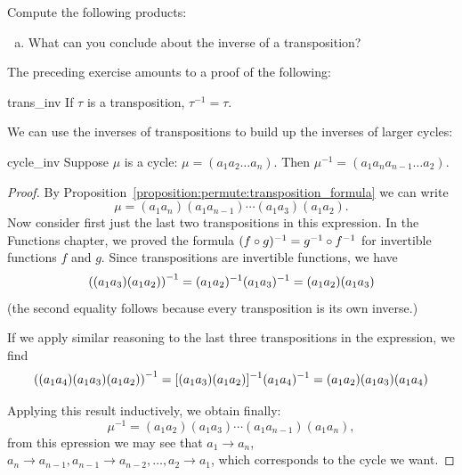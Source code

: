\begin{exercise}{}
Compute the following products:
\begin{enumerate}[(a)]
\item
What can you conclude about the inverse of a transposition?
\end{enumerate}
\end{exercise}

\noindent
The preceding exercise amounts to a proof of the following:

\begin{prop}{trans_inv}
If $\tau$ is a transposition, $\tau^{-1} = \tau$.
\end{prop}

We can use the inverses of transpositions to build up the inverses of larger cycles:

\begin{prop}{cycle_inv}
Suppose $\mu$ is a cycle: $\mu = (a_1 a_2 \ldots  a_n)$. Then $\mu^{-1} = (a_1 a_n a_{n-1}  \ldots a_2 )$.
\end{prop}

\begin{proof}
By Proposition~\ref{proposition:permute:transposition_formula} we can write 
\[ \mu = (a_1 a_n ) (a_1 a_{n-1} ) \cdots ( a_1 a_3) (a_1 a_2).
\]
Now consider first just the last two transpositions in this expression.
In the Functions chapter, we proved the formula  $(f \circ g)^{-1} = g^{-1} \circ f^{-1}$ for invertible functions $f$ and $g$.
Since transpositions are invertible functions, we have
\[
{\large(}(a_1 a_3)(a_1 a_2){\large)}^{-1} = (a_1 a_2)^{-1} ( a_1 a_3)^{-1} = (a_1 a_2 ) (a_1 a_3 ) \]
(the second equality follows because every transposition is its own inverse.)

If we apply similar reasoning to the last three transpositions in the expression, we find
\[
{\large(}(a_1 a_4)(a_1 a_3)(a_1 a_2){\large)}^{-1} = [(a_1 a_3)(a_1 a_2)]^{-1} ( a_1 a_4)^{-1} = (a_1 a_2 ) (a_1 a_3 ) (a_1 a_4) \]

 Applying this result inductively, we obtain finally: 
\[
\mu^{-1} = (a_1 a_2) ( a_1 a_3) \cdots (a_1 a_{n-1} ) (a_1 a_n ), \]
from this epression we may see that $a_1 \rightarrow a_n$, $a_n \rightarrow a_{n-1}, a_{n-1} \rightarrow a_{n-2}, \ldots, a_{2} \rightarrow a_{1}$, which 
corresponds to the cycle we want.
\end{proof}

